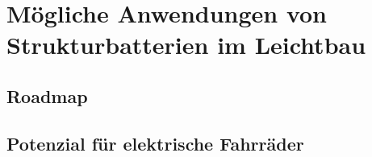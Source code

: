 \chapter{Mögliche Anwendungen von Strukturbatterien im Leichtbau}
\section{Roadmap}
\section{Potenzial für elektrische Fahrräder}
